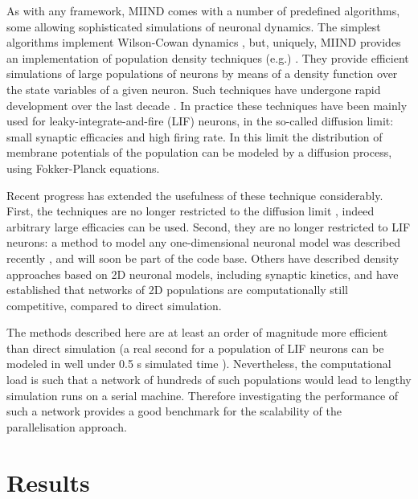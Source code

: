 \documentclass[12pt]{article}
\begin{document}
As with any framework, MIIND comes with a number of predefined algorithms, some allowing sophisticated simulations of neuronal 
dynamics. The simplest algorithms implement Wilson-Cowan dynamics \citep{wilson1972}, but, uniquely, 
MIIND provides an implementation of population density techniques (e.g.) \citep{stein1965,knight1972,knight1996}. They provide efficient simulations 
of large populations of neurons by means of a density function over the state variables of a given neuron. Such techniques have undergone rapid 
development over the last decade \citep{omurtag2000}. In practice these techniques have been mainly used for leaky-integrate-and-fire (LIF) neurons,
in the so-called diffusion limit: small synaptic efficacies and high firing rate. In  this limit the distribution of membrane potentials of the
population can be modeled by a diffusion process, using Fokker-Planck equations. 

Recent progress has extended the usefulness of these technique considerably.  First, the techniques are no longer restricted to the diffusion limit 
\citep{omurtag2000,dekamps2003,dekamps2006}, indeed arbitrary large efficacies can be used.  Second, they are no longer restricted to LIF neurons: 
a method to model any one-dimensional neuronal model was described recently \citep{dekamps2013}, and will soon be part of the code base.
Others have described density approaches based on 2D neuronal models, including synaptic kinetics, and have established that networks
of 2D populations are computationally still competitive, compared to direct simulation.
  
The methods described here are at least an order of magnitude more efficient than direct simulation (a real second for a population of LIF neurons
can be modeled in well under 0.5 s simulated time \citep{dekamps2006}). Nevertheless, the computational load is such that a network of hundreds of such 
populations would lead to lengthy simulation runs on a serial machine. Therefore investigating the performance of such a network provides a good
benchmark for the scalability of the parallelisation approach.



\section{Results}
\end{document}
